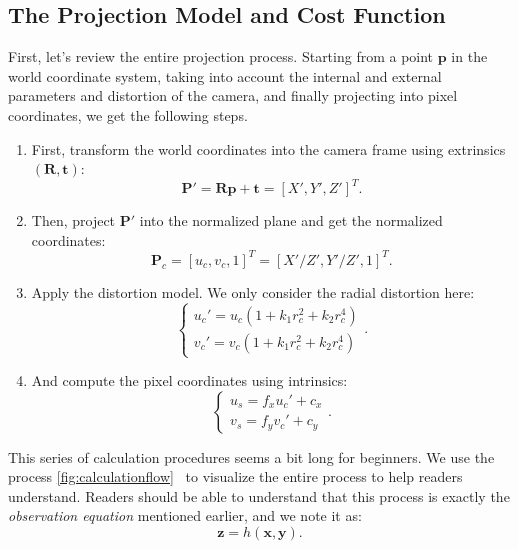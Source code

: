 \subsection{The Projection Model and Cost Function}
First, let's review the entire projection process. Starting from a point $\mathbf{p}$ in the world coordinate system, taking into account the internal and external parameters and distortion of the camera, and finally projecting into pixel coordinates, we get the following steps.

\begin{enumerate}
	\item First, transform the world coordinates into the camera frame using extrinsics $(\mathbf{R}, \mathbf{t})$:
	\begin{equation}
		\mathbf{P}' = \mathbf{R} \mathbf{p} + \mathbf{t} = [X', Y', Z']^T.
	\end{equation}
	\item Then, project $\mathbf{P}'$ into the normalized plane and get the normalized coordinates: 
	\begin{equation}
		\mathbf{P}_c = [u_c, v_c, 1]^T = [X'/Z', Y'/Z', 1]^T.
	\end{equation}
	\item Apply the distortion model. We only consider the radial distortion here: 
	\begin{equation}
		\left\{
		\begin{array}{l}
			u_c' = {u_c}\left( {1 + {k_1}r_c^2 + {k_2}r_c^4} \right)\\
			v_c' = {v_c}\left( {1 + {k_1}r_c^2 + {k_2}r_c^4} \right)
		\end{array}
		\right. .
	\end{equation}
	\item And compute the pixel coordinates using intrinsics:
	\begin{equation}
		\left\{ \begin{array}{l}
			{u_s} = {f_x}u_c' + {c_x}\\
			{v_s} = {f_y}v_c' + {c_y} 
		\end{array} \right. .
	\end{equation}
\end{enumerate}

This series of calculation procedures seems a bit long for beginners. We use the process \autoref{fig:calculationflow}~ to visualize the entire process to help readers understand. Readers should be able to understand that this process is exactly the \textit{observation equation} mentioned earlier, and we note it as:
\begin{equation}
	\mathbf{z} = h(\mathbf{x}, \mathbf{y}).
\end{equation}

